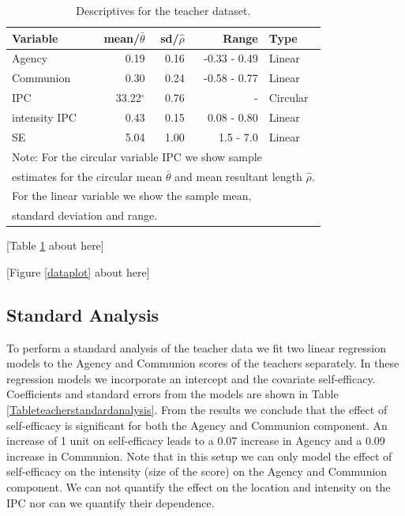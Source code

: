 \documentclass[man,mask]{apa6}
\begin{document}
\begin{table}[h]
\centering
\caption{Descriptives for the teacher dataset.} 
\begin{tabular}{lrrrl}
  \noalign{\smallskip}\hline\noalign{\smallskip}
Variable & mean/$\bar{\theta}$ & sd/$\hat{\rho}$ & Range & Type \\ \hline\noalign{\smallskip}
Agency & 0.19 & 0.16 & -0.33 - 0.49 & Linear\\
Communion & 0.30 & 0.24 & -0.58 - 0.77 & Linear\\
IPC &33.22$^\circ$& 0.76 & - & Circular\\
intensity IPC & 0.43 & 0.15 & 0.08 - 0.80 & Linear\\
SE & 5.04 & 1.00 & 1.5 - 7.0 & Linear\\
   \hline
\multicolumn{5}{l}{Note: For the circular variable IPC we show sample }\\
\multicolumn{5}{l}{estimates for the circular mean $\bar{\theta}$ and mean resultant length $\hat{\rho}$.}\\
\multicolumn{5}{l}{For the linear variable we show the sample mean,}\\
\multicolumn{5}{l}{standard deviation and range.}
\end{tabular}
\label{Tableteacherdescriptives}
\end{table}

\hfil [Table \ref{Tableteacherdescriptives} about here] \hfil

\hfil [Figure \ref{dataplot} about here] \hfil

\subsection{Standard Analysis}\label{StandardAnalysis}

To perform a standard analysis of the teacher data we fit two linear regression
models to the Agency and Communion scores of the teachers separately. In these
regression models we incorporate an intercept and the covariate self-efficacy.
Coefficients and standard errors from the models are shown in Table
\ref{Tableteacherstandardanalysis}. From the results we conclude that the effect
of self-efficacy is significant for both the Agency and Communion component. An
increase of 1 unit on self-efficacy leads to a 0.07 increase in Agency and a
0.09 increase in Communion. Note that in this setup we can only model the effect
of self-efficacy on the intensity (size of the score) on the Agency and
Communion component. We can not quantify the effect on the location and
intensity on the IPC nor can we quantify their dependence.
\end{document}
